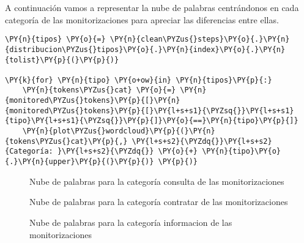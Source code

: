 A continuación vamos a representar la nube de palabras centrándonos en cada categoría de las monitorizaciones para apreciar las diferencias entre ellas. 

    \begin{tcolorbox}[breakable, size=fbox, boxrule=1pt, pad at break*=1mm,colback=cellbackground, colframe=cellborder]
\begin{Verbatim}[commandchars=\\\{\}]
\PY{n}{tipos} \PY{o}{=} \PY{n}{clean\PYZus{}steps}\PY{o}{.}\PY{n}{distribucion\PYZus{}tipos}\PY{o}{.}\PY{n}{index}\PY{o}{.}\PY{n}{tolist}\PY{p}{(}\PY{p}{)}

\PY{k}{for} \PY{n}{tipo} \PY{o+ow}{in} \PY{n}{tipos}\PY{p}{:}
    \PY{n}{tokens\PYZus{}cat} \PY{o}{=} \PY{n}{monitored\PYZus{}tokens}\PY{p}{[}\PY{n}{monitored\PYZus{}tokens}\PY{p}{[}\PY{l+s+s1}{\PYZsq{}}\PY{l+s+s1}{tipo}\PY{l+s+s1}{\PYZsq{}}\PY{p}{]}\PY{o}{==}\PY{n}{tipo}\PY{p}{]}
    \PY{n}{plot\PYZus{}wordcloud}\PY{p}{(}\PY{n}{tokens\PYZus{}cat}\PY{p}{,} \PY{l+s+s2}{\PYZdq{}}\PY{l+s+s2}{Categoría: }\PY{l+s+s2}{\PYZdq{}} \PY{o}{+} \PY{n}{tipo}\PY{o}{.}\PY{n}{upper}\PY{p}{(}\PY{p}{)} \PY{p}{)}
\end{Verbatim}
\end{tcolorbox}


    
    \begin{figure}[!ht]
    	\centering
    	
    	
        \caption{Nube de palabras para la categoría consulta de las monitorizaciones}
        \label{fig:cloudmoni_consulta}
    \end{figure}    
    
    
    \begin{figure}[!ht]
        	\centering
        	
        	
            \caption{Nube de palabras para la categoría contratar de las monitorizaciones}
            \label{fig:cloudmoni_contratar}
        \end{figure}    
   
   
       \begin{figure}[!ht]
           	\centering
           	
           	
               \caption{Nube de palabras para la categoría informacion de las monitorizaciones}
               \label{fig:cloudmoni_info}
           \end{figure}  
              
